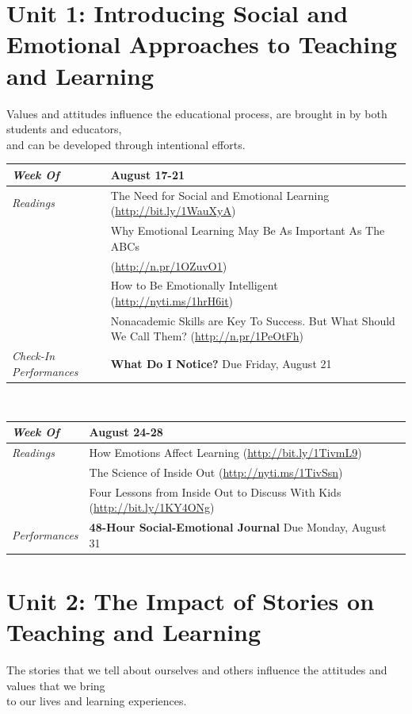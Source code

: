 \documentclass[two-side]{tufte-handout}
\newcommand{\gentopic}[1]{\begin{fullwidth}\begin{center}\faKey \textsf{#1}\end{center}\end{fullwidth}}
\newcommand{\tabread}{\faBook\medspace\textit{Readings}}
\newcommand{\tabperformance}{\faTasks\medspace\textit{Performances}}
\newcommand{\tabdt}{\faCalendar\medspace\textit{Week Of}}
\newcommand{\tabcheckin}{\faCheckSquareO\medspace\textit{Check-In Performances}}
\newcommand{\tabbreak}{\begin{fullwidth}\begin{center}\faAsterisk\faAsterisk\faAsterisk\\\end{center}\end{fullwidth}}
\newenvironment{tabsched}
	{\small
	\begin{tabular}{p{1.5in}p{4.5in}}
	\midrule}
	{\midrule
	\end{tabular}
	\normalsize}
\newcommand{\weekone}{August 17-21}
\newcommand{\weektwo}{August 24-28}
\begin{document}
	\section{Unit 1: Introducing Social and Emotional Approaches to Teaching and Learning}

\gentopic{Values and attitudes influence the educational process, are brought in by both students and educators,\\and can be developed through intentional efforts.}


\begin{tabsched}
	\tabdt & \weekone \\
	\midrule
	\tabread & The Need for Social and Emotional Learning (\url{http://bit.ly/1WauXyA}) \\
	& Why Emotional Learning May Be As Important As The ABCs \\
	& (\url{http://n.pr/1OZuvO1}) \\
	& How to Be Emotionally Intelligent (\url{http://nyti.ms/1hrH6it}) \\
	& Nonacademic Skills are Key To Success. But What Should We Call Them?  (\url{http://n.pr/1PeOtFh}) \\
	\midrule
	\tabcheckin & \textbf{What Do I Notice?} Due Friday, August 21 \\
\end{tabsched}

\tabbreak

\begin{tabsched}
	\tabdt & \weektwo \\
	\midrule
	\tabread & How Emotions Affect Learning (\url{http://bit.ly/1TivmL9})\\
	& The Science of Inside Out (\url{http://nyti.ms/1TivSsn})\\
	& Four Lessons from Inside Out to Discuss With Kids (\url{http://bit.ly/1KY4ONg})\\
	\midrule
	\tabperformance & \textbf{48-Hour Social-Emotional Journal} Due Monday, August 31 \\
\end{tabsched}

	\section{Unit 2: The Impact of Stories on Teaching and Learning}

\gentopic{The stories that we tell about ourselves and others influence the attitudes and values that we bring\\to our lives and learning experiences.}
\end{document}
